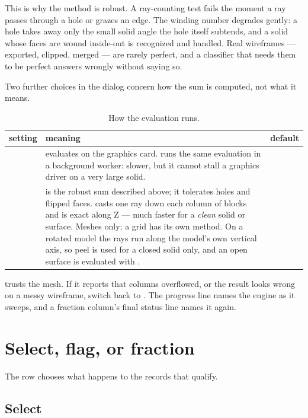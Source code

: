 This is why the method is robust. A ray-counting test fails the moment a ray passes through a hole or grazes an edge. The winding number degrades gently: a hole takes away only the small solid angle the hole itself subtends, and a solid whose faces are wound inside-out is recognized and handled. Real wireframes — exported, clipped, merged — are rarely perfect, and a classifier that needs them to be perfect answers wrongly without saying so.

Two further choices in the dialog concern how the sum is computed, not what it means.

\begin{table}[htbp]\small
\begin{tabularx}{\linewidth}{@{}lMD@{}}\toprule
setting & meaning & default \\ \midrule
{} &  evaluates on the graphics card.  runs the same evaluation in a background worker: slower, but it cannot stall a graphics driver on a very large solid. &  \\
 &  is the robust sum described above; it tolerates holes and flipped faces.  casts one ray down each column of blocks and is exact along Z — much faster for a \emph{clean} solid or surface. Meshes only; a grid has its own method. On a rotated model the rays run along the model's own vertical axis, so peel is used for a closed solid only, and an open surface is evaluated with . &  \\ \bottomrule
\end{tabularx}
\caption{How the evaluation runs.}\label{tab:geometry-engine}
\end{table}

\begin{caution}
 trusts the mesh. If it reports that columns overflowed, or the result looks wrong on a messy wireframe, switch back to . The progress line names the engine as it sweeps, and a fraction column's final status line names it again.
\end{caution}

\section{Select, flag, or fraction}\label{sec:geometry-do}

The  row chooses what happens to the records that qualify.

\subsection{Select}

